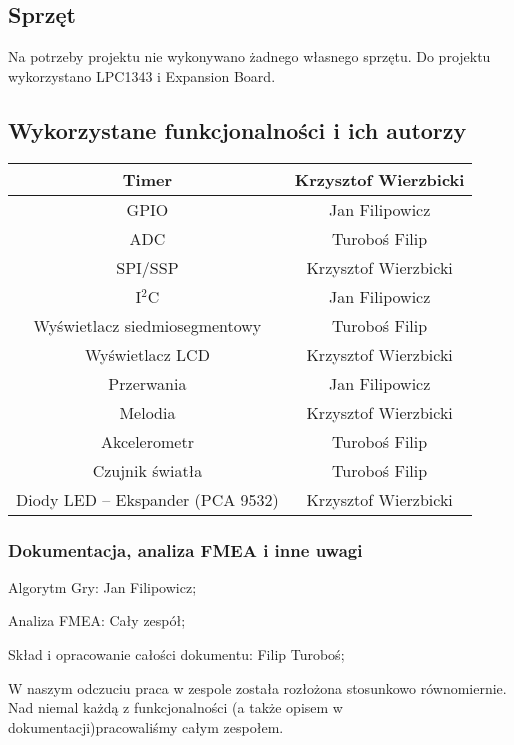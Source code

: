 \documentclass[a4paper,12pt,twoside]{article}
\theoremstyle{plain}
\theoremstyle{definition}
\theoremstyle{remark}
\begin{document}
\subsection{Sprzęt}
Na potrzeby projektu nie wykonywano żadnego własnego sprzętu.
Do projektu wykorzystano LPC1343 i Expansion Board.
\subsection{Wykorzystane funkcjonalności i ich autorzy}

\begin{tabular}{|c|c|} \hline
	 Timer&{Krzysztof Wierzbicki}\\ \hline
	 GPIO&{Jan Filipowicz}\\ \hline
	 ADC&{Turoboś Filip}\\ \hline
	 SPI/SSP&{Krzysztof Wierzbicki}\\ \hline
	 I$^2$C&{Jan Filipowicz}\\ \hline
	 Wyświetlacz siedmiosegmentowy&{Turoboś Filip}\\ \hline
	 Wyświetlacz LCD&{Krzysztof Wierzbicki}\\ \hline
	 Przerwania&{Jan Filipowicz}\\ \hline
	 Melodia&{Krzysztof Wierzbicki}\\ \hline
	 Akcelerometr&{Turoboś Filip}\\ \hline
	 Czujnik światła&{Turoboś Filip}\\ \hline
	 Diody LED -- Ekspander (PCA 9532)&{Krzysztof Wierzbicki}\\ \hline
\end{tabular}
\subsubsection{Dokumentacja, analiza FMEA i inne uwagi}
Algorytm Gry: Jan Filipowicz;

\noindent Analiza FMEA: Cały zespół;

\noindent Skład i opracowanie całości dokumentu: Filip Turoboś;

W naszym odczuciu praca w zespole została rozłożona stosunkowo równomiernie. Nad niemal każdą z funkcjonalności (a także opisem w dokumentacji)pracowaliśmy całym zespołem.
\end{document}
